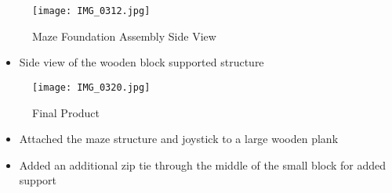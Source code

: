 \documentclass[12pt]{article}
\begin{document}
\begin{figure}[H]
    \centering
    \texttt{[image: IMG\_0312.jpg]}
    \caption{Maze Foundation Assembly Side View}
    \label{fig:enter-label}
\end{figure}

\begin{itemize}
    \item Side view of the wooden block supported structure 
  \end{itemize}

\begin{figure}[H]
    \centering
    \texttt{[image: IMG\_0320.jpg]}
    \caption{Final Product}
    \label{fig:enter-label}
\end{figure}

\begin{itemize}
    \item Attached the maze structure and joystick to a large wooden plank
    \item Added an additional zip tie through the middle of the small block for added support
  \end{itemize}
\end{document}
